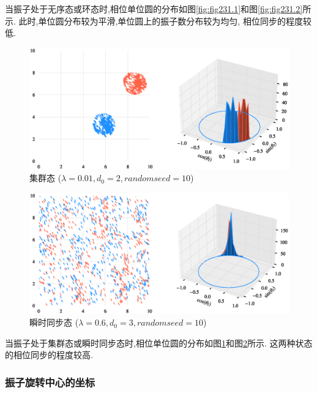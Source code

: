 \documentclass{article}
\begin{document}
当振子处于无序态或环态时,相位单位圆的分布如图\ref{fig:fig231.1}和图\ref{fig:fig231.2}所示. 此时,单位圆分布较为平滑,单位圆上的振子数分布较为均匀, 相位同步的程度较低.

\begin{figure}[H]
	\centering
	\includegraphics[width=\textwidth]{./figs/CorrectCoupling_uniform_0.010_2.00.eps}
	\vspace{-1cm}
	\caption{集群态 ($\lambda=0.01, d_0=2, random seed=10$)}
	\label{fig:fig231.3}
\end{figure}

\begin{figure}[H]
	\centering
	\includegraphics[width=\textwidth]{./figs/CorrectCoupling_uniform_0.600_3.00.eps}
	\vspace{-1cm}
	\caption{瞬时同步态 ($\lambda=0.6, d_0=3, random seed=10$)}
	\label{fig:fig231.4}
\end{figure}

当振子处于集群态或瞬时同步态时,相位单位圆的分布如图\ref{fig:fig231.3}和图\ref{fig:fig231.4}所示. 这两种状态的相位同步的程度较高.

\newpage
\subsubsection{振子旋转中心的坐标}
\end{document}
